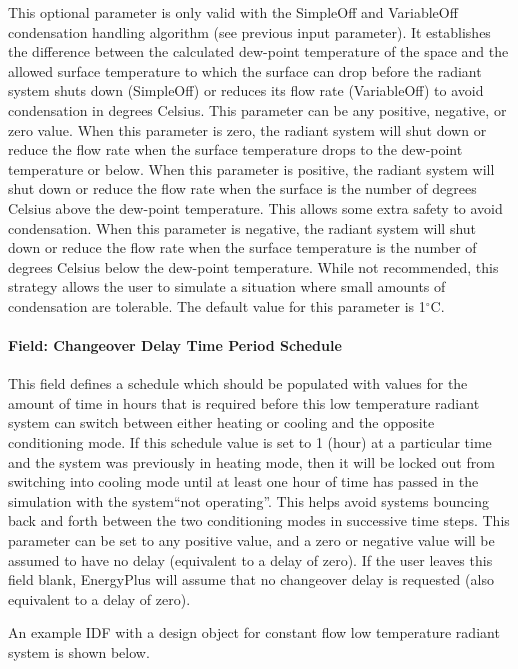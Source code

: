 This optional parameter is only valid with the SimpleOff and VariableOff condensation handling algorithm (see previous input parameter). It establishes the difference between the calculated dew-point temperature of the space and the allowed surface temperature to which the surface can drop before the radiant system shuts down (SimpleOff) or reduces its flow rate (VariableOff) to avoid condensation in degrees Celsius. This parameter can be any positive, negative, or zero value. When this parameter is zero, the radiant system will shut down or reduce the flow rate when the surface temperature drops to the dew-point temperature or below. When this parameter is positive, the radiant system will shut down or reduce the flow rate when the surface is the number of degrees Celsius above the dew-point temperature. This allows some extra safety to avoid condensation. When this parameter is negative, the radiant system will shut down or reduce the flow rate when the surface temperature is the number of degrees Celsius below the dew-point temperature. While not recommended, this strategy allows the user to simulate a situation where small amounts of condensation are tolerable.  The default value for this parameter is 1$^\circ$C.

\paragraph{Field: Changeover Delay Time Period Schedule}\label{field-changeover-delay-time-period-schedule-1}

This field defines a schedule which should be populated with values for the amount of time in hours that is required before this low temperature radiant system can switch between either heating or cooling and the opposite conditioning mode.  If this schedule value is set to 1 (hour) at a particular time and the system was previously in heating mode, then it will be locked out from switching into cooling mode until at least one hour of time has passed in the simulation with the system``not operating''.  This helps avoid systems bouncing back and forth between the two conditioning modes in successive time steps.  This parameter can be set to any positive value, and a zero or negative value will be assumed to have no delay (equivalent to a delay of zero).  If the user leaves this field blank, EnergyPlus will assume that no changeover delay is requested (also equivalent to a delay of zero).

An example IDF with a design object for constant flow low temperature radiant system is shown below.

